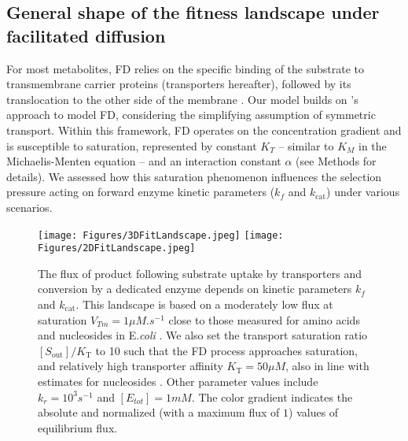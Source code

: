 \documentclass[11pt,onecolumn]{article}
\begin{document}
\subsection{General shape of the fitness landscape under facilitated diffusion}

For most metabolites, FD relies on the specific binding of the substrate to transmembrane carrier proteins (transporters hereafter), followed by its translocation to the other side of the membrane \citep{danielli1954,Kotyk67,Stein86d}. Our model builds on \citet{Kuile94}'s approach to model FD, considering the simplifying assumption of symmetric transport. Within this framework, FD operates on the concentration gradient \citep{Bosdriesz18} and is susceptible to saturation, represented by constant $K_T$ -- similar to $K_M$ in the Michaelis-Menten equation -- and an interaction constant $\alpha$ (see Methods for details). We assessed how this saturation phenomenon influences the selection pressure acting on forward enzyme kinetic parameters ($k_f$ and $k_\text{cat}$) under various scenarios. 

\begin{figure*}[t!]
\centering
\texttt{[image: Figures/3DFitLandscape.jpeg]} 
\texttt{[image: Figures/2DFitLandscape.jpeg]}  
\caption{The flux of product following substrate uptake by transporters and conversion by a dedicated enzyme depends on kinetic parameters $k_f$ and $k_\text{cat}$. This landscape is based on a moderately low flux at saturation $V_{Tm}=1 \mu M.s^{-1}$ close to those measured for amino acids and nucleosides in E.\textit{coli} \citep{Zampieri2019}. We also set the transport saturation ratio $[S_\text{out}]/K_\text{T}$ to 10 such that the FD process approaches saturation, and relatively high transporter affinity $K_\text{T}=50\mu M$, also in line with estimates for nucleosides \citep{Griffith96,Xie04}. Other parameter values include $k_r=10^3s^{-1}$ and $[E_{tot}]=1mM$. The color gradient indicates the absolute and normalized (with a maximum flux of $1$) values of equilibrium flux.
}
\label{figure3D2DFit}
\end{figure*}
\end{document}
